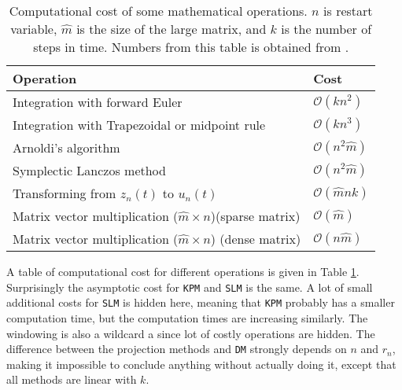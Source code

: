 \begin{table}
\caption{Computational cost of some mathematical operations. $n$ is restart variable, $\hat{m}$ is the size of the large matrix, and $k$ is the number of steps in time. Numbers from this table is obtained from \cite{complex}. }
\centering
\begin{tabular}{l l }
Operation & Cost \\
\hline
Integration with forward Euler & $\mathcal{O}(k n^2)$ \\
Integration with Trapezoidal or midpoint rule & $\mathcal{O}(k n^3)$ \\
Arnoldi's algorithm & $ \mathcal{ O }(n^2 \hat{m})$ \\
Symplectic Lanczos method & $ \mathcal{O}(n^2 \hat{m}) $\\
Transforming from $z_n(t)$ to $u_n(t)$ & $ \mathcal{O}(\hat{m}nk) $\\
Matrix vector multiplication ($\hat{m}\times n$)(sparse matrix) & $ \mathcal{O}(\hat{m}) $ \\
Matrix vector multiplication ($\hat{m}\times n$) (dense matrix) & $ \mathcal{O}(n \hat{m}) $
\end{tabular}


\label{tab:cd}
\end{table}

\noindent A table of computational cost for different operations is given in Table \ref{tab:cd}. \\
Surprisingly the asymptotic cost for \texttt{KPM} and \texttt{SLM} is the same. A lot of small additional costs for \texttt{SLM} is hidden here, meaning that \texttt{KPM} probably has a smaller computation time, but the computation times are increasing similarly. The windowing is also a wildcard a since lot of costly operations are hidden. The difference between the projection methods and \texttt{DM} strongly depends on $n$ and $r_n$, making it impossible to conclude anything without actually doing it, except that all methods are linear with $k$. \\


